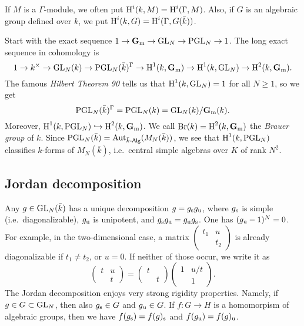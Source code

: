 If $M$ is a $\Gamma$-module, we often put $\operatorname{H}^i(k,M) = \operatorname{H}^i(\Gamma,M)$. 
Also, if $G$ is an algebraic group defined over $k$, we put 
$\operatorname{H}^i(k,G) = \operatorname{H}^i(\Gamma,G(\bar k))$. 

\begin{example}
Start with the exact sequence 
$1 \to \mathbf{G}_{\mathrm{m}} \to \operatorname{GL}_N \to \operatorname{PGL}_N \to 1$. 
The long exact sequence in cohomology is 
\[
  1 \to k^\times \to \operatorname{GL}_N(k) \to \operatorname{PGL}_N(\bar k)^\Gamma \to \operatorname{H}^1(k,\mathbf{G}_{\mathrm{m}}) \to \operatorname{H}^1(k,\operatorname{GL}_N) \to \operatorname{H}^2(k,\mathbf{G}_{\mathrm{m}}) .
\]
The famous \emph{Hilbert Theorem 90} tells us that 
$\operatorname{H}^1(k,\operatorname{GL}_N) = 1$ for all $N\geqslant 1$, so we get 
\[
  \operatorname{PGL}_N(\bar k)^\Gamma = \operatorname{PGL}_N(k) = \operatorname{GL}_N(k)/\mathbf{G}_{\mathrm{m}}(k) .
\]
Moreover, $\operatorname{H}^1(k,\operatorname{PGL}_N)\hookrightarrow \operatorname{H}^2(k,\mathbf{G}_{\mathrm{m}})$. We call 
$\operatorname{Br}(k)=\operatorname{H}^2(k,\mathbf{G}_{\mathrm{m}})$ the \emph{Brauer group} of $k$. 
Since 
$\operatorname{PGL}_N(\bar k) = \operatorname{Aut}_{\bar k\text{-}\mathsf{Alg}}(M_N(\bar k))$, 
we see that $\operatorname{H}^1(k,\operatorname{PGL}_N)$ classifies $k$-forms of 
$M_N(\bar k)$, i.e.~central simple algebras over $K$ of rank $N^2$. 
\end{example}





\subsection{Jordan decomposition}

Any $g\in \operatorname{GL}_N(\bar k)$ has a unique decomposition 
$g=g_{\mathrm{s}} g_{\mathrm{u}}$, where $g_{\mathrm{s}}$ is simple (i.e.~diagonalizable), 
$g_{\mathrm{u}}$ is unipotent, and 
$g_{\mathrm{s}} g_{\mathrm{u}} = g_{\mathrm{u}} g_{\mathrm{s}}$. One has 
$(g_{\mathrm{u}} - 1)^N=0$. For example, in the two-dimensional case, a matrix 
$\begin{pmatrix} t_1 & u \\ & t_2\end{pmatrix}$ is already diagonalizable if 
$t_1\ne t_2$, or $u=0$. If neither of those occur, we write it as 
\[
  \begin{pmatrix} t & u \\ & t \end{pmatrix} = \begin{pmatrix} t \\ & t\end{pmatrix} \begin{pmatrix} 1 & u/t \\ & 1 \end{pmatrix} .
\]
The Jordan decomposition enjoys very strong rigidity properties. Namely, 
if $g\in G\subset \operatorname{GL}_N$, then also $g_{\mathrm{s}}\in G$ and 
$g_{\mathrm{u}} \in G$. If $f:G\to H$ is a homomorpism of algebraic groups, then 
we have $f(g_{\mathrm{s}}) = f(g)_{\mathrm{s}}$ and $f(g_{\mathrm{u}}) = f(g)_{\mathrm{u}}$. 





